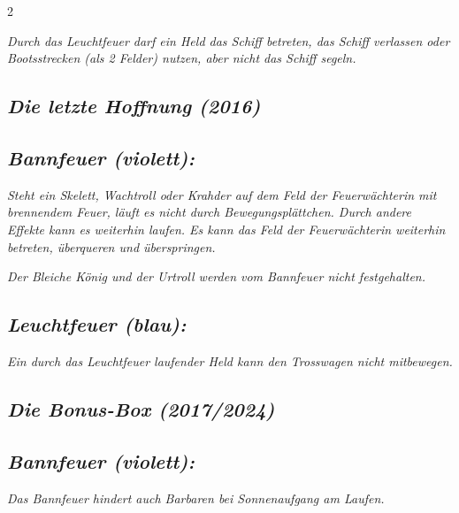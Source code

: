 \documentclass[10pt, a4paper, oneside]{book}
\newcommand{\fan}[1]{\textit{#1}}
\begin{document}
\begin{multicols*}{2}
\begin{bgcolor}
\fan{Durch das Leuchtfeuer darf ein Held das Schiff betreten, das Schiff verlassen oder Bootsstrecken (als 2 Felder) nutzen, aber nicht das Schiff segeln.}

\end{bgcolor}





\begin{bgcolor}
\section{\fan{Die letzte Hoffnung (2016)}}


\subsection{\fan{Bannfeuer (violett):}}

\fan{Steht ein Skelett, Wachtroll oder Krahder auf dem Feld der Feuerwächterin mit brennendem Feuer, läuft es nicht durch Bewegungsplättchen. Durch andere Effekte kann es weiterhin laufen. Es kann das Feld der Feuerwächterin weiterhin betreten, überqueren und überspringen.}

\fan{Der Bleiche König und der Urtroll werden vom Bannfeuer nicht festgehalten.}


\subsection{\fan{Leuchtfeuer (blau):}}


\fan{Ein durch das Leuchtfeuer laufender Held kann den Trosswagen nicht mitbewegen.}

\end{bgcolor}



\columnbreak



\begin{bgcolor}[color-bb]
\section{\fan{Die Bonus-Box (2017/2024)}}

\subsection{\fan{Bannfeuer (violett):}}

\fan{Das Bannfeuer hindert auch Barbaren bei Sonnenaufgang am Laufen.}


\end{bgcolor}
\end{multicols*}
\end{document}

